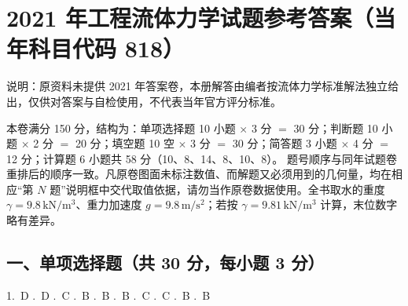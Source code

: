 \chapter{2021 年工程流体力学试题参考答案（当年科目代码 818）}

\begin{tishi}
说明：原资料未提供 2021 年答案卷，本册解答由编者按流体力学标准解法独立给出，仅供对答案与自检使用，不代表当年官方评分标准。

本卷满分 150 分，结构为：单项选择题 10 小题 $\times$ 3 分 $=$ 30 分；判断题 10 小题 $\times$ 2 分 $=$ 20 分；填空题 10 空 $\times$ 3 分 $=$ 30 分；简答题 3 小题 $\times$ 4 分 $=$ 12 分；计算题 6 小题共 58 分（10、8、14、8、10、8）。
题号顺序与同年试题卷重排后的顺序一致。凡原卷图面未标注数值、而解题又必须用到的几何量，均在相应“第 $N$ 题”说明框中交代取值依据，请勿当作原卷数据使用。全书取水的重度 $\gamma=9.8\,\mathrm{kN/m^3}$、重力加速度 $g=9.8\,\mathrm{m/s^2}$；若按 $\gamma=9.81\,\mathrm{kN/m^3}$ 计算，末位数字略有差异。
\end{tishi}

\section{一、单项选择题（共 30 分，每小题 3 分）}

\begin{center}
1.~D .~D .~C .~B .~B .~B .~C .~C .~B .~B
\end{center}

